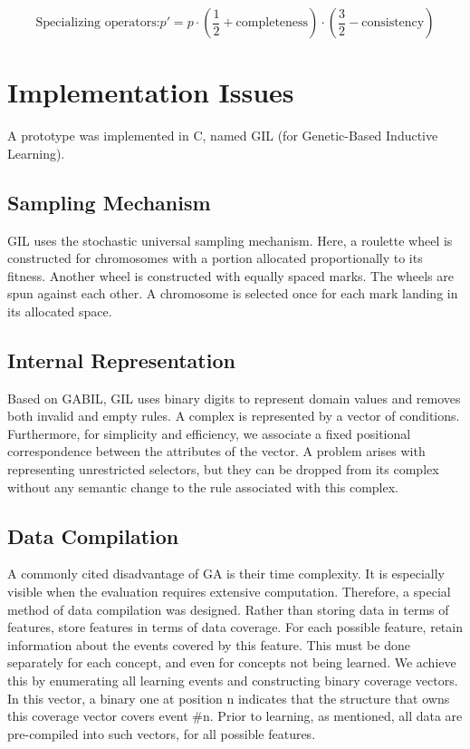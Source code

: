 \documentclass[../main.tex]{subfiles}
\begin{document}
\begin{equation}
	\text{Specializing operators:} p' = p \cdot \left( \frac{1}{2} + \text{completeness} \right) \cdot \left(
	\frac{3}{2} - \text{consistency} \right)
\end{equation}

\section{Implementation Issues}

A prototype was implemented in C, named GIL (for Genetic-Based Inductive Learning).

\subsection{Sampling Mechanism}

GIL uses the stochastic universal sampling mechanism. Here, a roulette wheel is constructed for chromosomes with a
portion allocated proportionally to its fitness. Another wheel is constructed with equally spaced marks. The wheels are
spun against each other. A chromosome is selected once for each mark landing in its allocated space.

\subsection{Internal Representation}

Based on GABIL, GIL uses  binary digits to represent domain values and removes both invalid and empty rules. A complex
is represented by a vector of conditions. Furthermore, for simplicity and efficiency, we associate a fixed positional
correspondence between the attributes of the vector. A problem arises with representing unrestricted selectors, but
they can be dropped from its complex without any semantic change to the rule associated with this complex.

\subsection{Data Compilation}
A commonly cited disadvantage of GA is their time complexity. It is especially visible when the evaluation requires
extensive computation. Therefore, a special method of data compilation was designed. Rather than storing data in terms
of features, store features in terms of data coverage. For each possible feature, retain information about the events
covered by this feature. This must be done separately for each concept, and even for concepts not being learned. We
achieve this by enumerating all learning events and constructing binary coverage vectors. In this vector, a binary one
at position n indicates that the structure that owns this coverage vector covers event \#n. Prior to learning, as
mentioned, all data are pre-compiled into such vectors, for all possible features.
\end{document}
